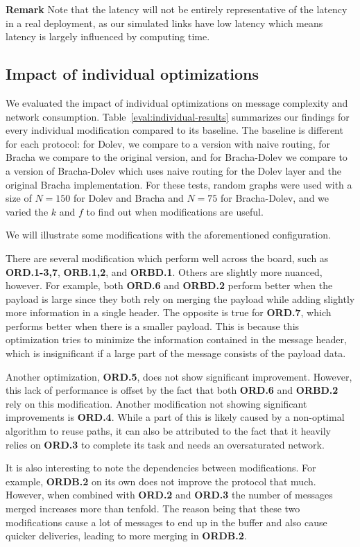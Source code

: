 \textbf{Remark}
Note that the latency will not be entirely representative of the latency in a real deployment, as our simulated links have low latency which means latency is largely influenced by computing time. 

\subsection{Impact of individual optimizations}
We evaluated the impact of individual optimizations on message complexity and network consumption. Table~\ref{eval:individual-results} summarizes our findings for every individual modification compared to its baseline. The baseline is different for each protocol: for Dolev, we compare to a version with naive routing, for Bracha we compare to the original version, and for Bracha-Dolev we compare to a version of Bracha-Dolev which uses naive routing for the Dolev layer and the original Bracha implementation. For these tests, random graphs were used with a size of $N=150$ for Dolev and Bracha and $N=75$ for Bracha-Dolev, and we varied the $k$ and $f$ to find out when modifications are useful. 

We will illustrate some modifications with the aforementioned configuration.

There are several modification which perform well across the board, such as \textbf{ORD.1-3,7}, \textbf{ORB.1,2}, and \textbf{ORBD.1}. Others are slightly more nuanced, however. For example, both \textbf{ORD.6} and \textbf{ORBD.2} perform better when the payload is large since they both rely on merging the payload while adding slightly more information in a single header. The opposite is true for \textbf{ORD.7}, which performs better when there is a smaller payload. This is because this optimization tries to minimize the information contained in the message header, which is insignificant if a large part of the message consists of the payload data.

Another optimization, \textbf{ORD.5}, does not show significant improvement. However, this lack of performance is offset by the fact that both \textbf{ORD.6} and \textbf{ORBD.2} rely on this modification. Another modification not showing significant improvements is \textbf{ORD.4}. While a part of this is likely caused by a non-optimal algorithm to reuse paths, it can also be attributed to the fact that it heavily relies on \textbf{ORD.3} to complete its task and needs an oversaturated network.

It is also interesting to note the dependencies between modifications. For example, \textbf{ORDB.2} on its own does not improve the protocol that much. However, when combined with \textbf{ORD.2} and \textbf{ORD.3} the number of messages merged increases more than tenfold. The reason being that these two modifications cause a lot of messages to end up in the buffer and also cause quicker deliveries, leading to more merging in \textbf{ORDB.2}.

